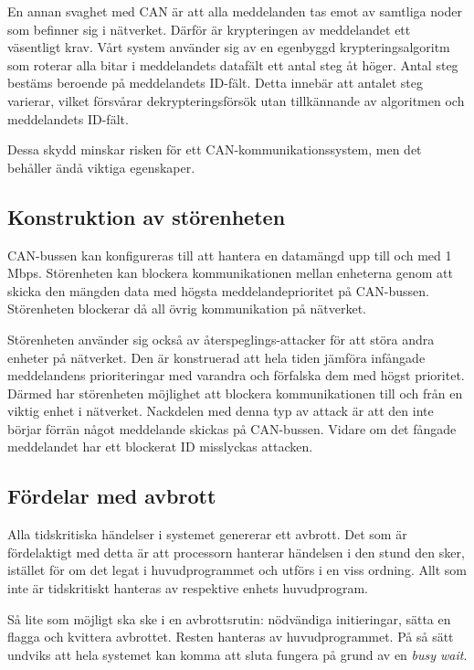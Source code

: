 En annan svaghet med CAN är att alla meddelanden tas emot av samtliga noder som befinner sig i nätverket. Därför är krypteringen av meddelandet ett väsentligt krav. Vårt system använder sig av en egenbyggd krypteringsalgoritm som roterar alla bitar i meddelandets datafält ett antal steg åt höger. Antal steg bestäms beroende på meddelandets ID-fält. Detta innebär att antalet steg varierar, vilket försvårar dekrypteringsförsök utan tillkännande av algoritmen och meddelandets ID-fält. 

Dessa skydd minskar risken för ett CAN-kommunikationssystem, men det behåller ändå viktiga egenskaper.

\subsection{Konstruktion av störenheten}

CAN-bussen kan konfigureras till att hantera en datamängd upp till och med 1 Mbps. Störenheten kan blockera kommunikationen mellan enheterna genom att skicka den mängden data med högsta meddelandeprioritet på CAN-bussen. Störenheten blockerar då all övrig kommunikation på nätverket.

Störenheten använder sig också av återspeglings-attacker för att störa andra enheter på nätverket. Den är konstruerad att hela tiden jämföra infångade meddelandens prioriteringar med varandra och förfalska dem med högst prioritet. Därmed har störenheten möjlighet att blockera kommunikationen till och från en viktig enhet i nätverket. Nackdelen med denna typ av attack är att den inte börjar förrän något meddelande skickas på CAN-bussen. Vidare om det fångade meddelandet har ett blockerat ID misslyckas attacken.

\subsection{Fördelar med avbrott}

Alla tidskritiska händelser i systemet genererar ett avbrott. Det som är fördelaktigt med detta är att processorn hanterar händelsen i den stund den sker, istället för om det legat i huvudprogrammet och utförs i en viss ordning. Allt som inte är tidskritiskt hanteras av respektive enhets huvudprogram.

Så lite som möjligt ska ske i en avbrottsrutin: nödvändiga initieringar, sätta en flagga och kvittera avbrottet. Resten hanteras av huvudprogrammet. På så sätt undviks att hela systemet kan komma att sluta fungera på grund av en \textit{busy wait}.

